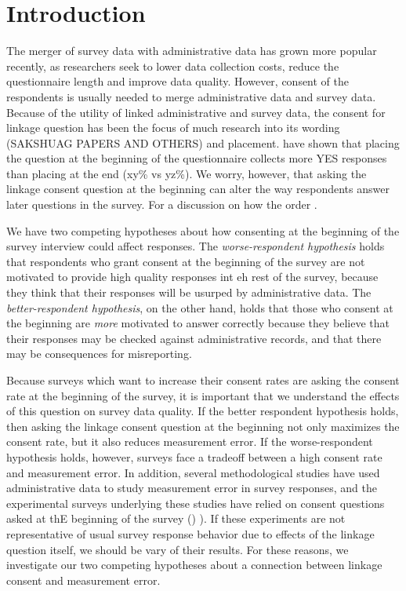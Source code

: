 \section{Introduction}

The merger of survey data with administrative data has grown more popular recently, as researchers seek to lower data collection costs, reduce the questionnaire length and improve data quality. However, consent of the respondents is usually needed to merge administrative data and survey data. Because of the utility of linked administrative and survey data, the consent for linkage question has been the focus of much research into its wording (SAKSHUAG PAPERS AND OTHERS) and placement. \cite{Sakshaugetal13} have shown that placing the question at the beginning of the questionnaire collects more YES responses than placing at the end (xy\% vs yz\%). We worry, however, that asking the linkage consent question at the beginning can alter the way respondents answer later questions in the survey. For a discussion on how the order \cite{McFarland81}. 

We have two competing hypotheses about how consenting at the beginning of the survey interview could affect responses. The \textit{worse-respondent hypothesis} holds that respondents who grant consent at the beginning of the survey are not motivated to provide high quality responses int eh rest of the survey, because they think that their responses will be usurped by administrative data. The \textit{better-respondent hypothesis}, on the other hand, holds that those who consent at the beginning are \textit{more} motivated to answer correctly because they believe that their responses may be checked against administrative records, and that there may be consequences for misreporting. 

Because surveys which want to increase their consent rates are asking the consent rate at the beginning of the survey, it is important that we understand the effects of this question on survey data quality. If the better respondent hypothesis holds, then asking the linkage consent question at the beginning not only maximizes the consent rate, but it also reduces measurement error. If the worse\--respondent hypothesis holds, however, surveys face a tradeoff between a high consent rate and  measurement error. In addition, several methodological studies have used administrative data to study measurement error in survey responses, and the experimental surveys underlying these studies have relied on consent questions asked at thE beginning of the survey (\cite{Kreuteretal10,Kreuteretal14}) \cite{Eckmanetal14} \cite{Eckmanetal15b}). If these experiments are not representative of usual survey response behavior due to effects of the linkage question itself, we should be vary of their results. For these reasons, we investigate our two competing hypotheses about a connection between linkage consent and measurement error.


